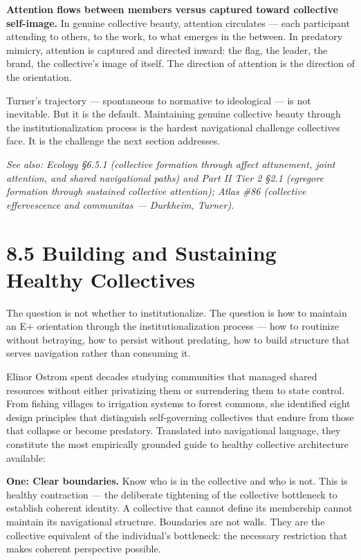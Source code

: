 \textbf{Attention flows between members versus captured toward collective self-image.} In genuine collective beauty, attention circulates — each participant attending to others, to the work, to what emerges in the between. In predatory mimicry, attention is captured and directed inward: the flag, the leader, the brand, the collective's image of itself. The direction of attention is the direction of the orientation.


Turner's trajectory — spontaneous to normative to ideological — is not inevitable. But it is the default. Maintaining genuine collective beauty through the institutionalization process is the hardest navigational challenge collectives face. It is the challenge the next section addresses.


\textit{See also: Ecology §6.5.1 (collective formation through affect attunement, joint attention, and shared navigational paths) and Part II Tier 2 §2.1 (egregore formation through sustained collective attention); Atlas \#86 (collective effervescence and communitas — Durkheim, Turner).}


\bigskip\noindent\makebox[\textwidth]{\color{rulegray}\rule{5cm}{0.3pt}}\bigskip


\section*{8.5 Building and Sustaining Healthy Collectives}


The question is not whether to institutionalize. The question is how to maintain an E+ orientation through the institutionalization process — how to routinize without betraying, how to persist without predating, how to build structure that serves navigation rather than consuming it.


Elinor Ostrom spent decades studying communities that managed shared resources without either privatizing them or surrendering them to state control. From fishing villages to irrigation systems to forest commons, she identified eight design principles that distinguish self-governing collectives that endure from those that collapse or become predatory. Translated into navigational language, they constitute the most empirically grounded guide to healthy collective architecture available:


\textbf{One: Clear boundaries.} Know who is in the collective and who is not. This is healthy contraction — the deliberate tightening of the collective bottleneck to establish coherent identity. A collective that cannot define its membership cannot maintain its navigational structure. Boundaries are not walls. They are the collective equivalent of the individual's bottleneck: the necessary restriction that makes coherent perspective possible.


